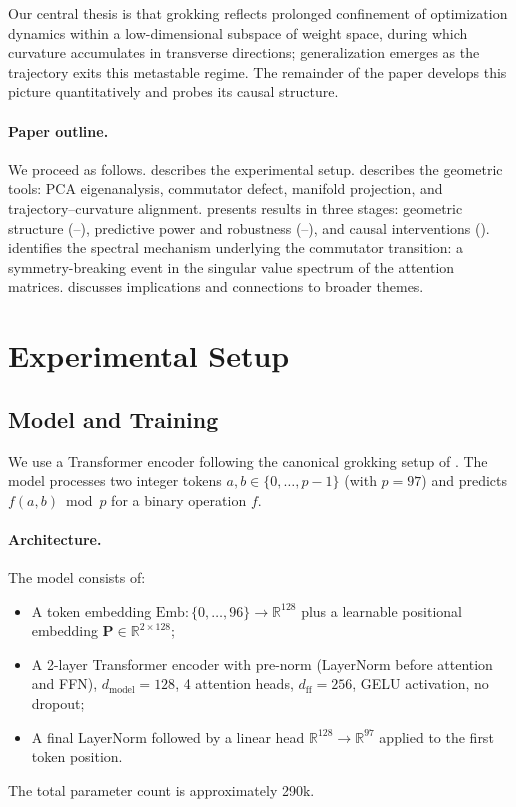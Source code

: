 \documentclass[11pt]{article}
\newcommand{\R}{\mathbb{R}}
\begin{document}
\noindent
Our central thesis is that grokking reflects prolonged confinement of optimization dynamics within a low-dimensional subspace of weight space, during which curvature accumulates in transverse directions; generalization emerges as the trajectory exits this metastable regime.
The remainder of the paper develops this picture quantitatively and probes its causal structure.

\paragraph{Paper outline.}
We proceed as follows.
 describes the experimental setup.
 describes the geometric tools: PCA eigenanalysis, commutator defect, manifold projection, and trajectory--curvature alignment.
 presents results in three stages: geometric structure (--), predictive power and robustness (--), and causal interventions ().
 identifies the spectral mechanism underlying the commutator transition: a symmetry-breaking event in the singular value spectrum of the attention matrices.
 discusses implications and connections to broader themes.


\section{Experimental Setup}
\label{sec:setup}

\subsection{Model and Training}

We use a Transformer encoder following the canonical grokking setup of \citet{power2022grokking}.
The model processes two integer tokens $a, b \in \{0, \ldots, p-1\}$ (with $p = 97$) and predicts $f(a,b) \bmod p$ for a binary operation $f$.

\paragraph{Architecture.}
The model consists of:
\begin{itemize}
    \item A token embedding $\mathrm{Emb}: \{0,\ldots,96\} \to \R^{128}$ plus a learnable positional embedding $\mathbf{P} \in \R^{2 \times 128}$;
    \item A 2-layer Transformer encoder with pre-norm (LayerNorm before attention and FFN), $d_\text{model} = 128$, 4 attention heads, $d_\text{ff} = 256$, GELU activation, no dropout;
    \item A final LayerNorm followed by a linear head $\R^{128} \to \R^{97}$ applied to the first token position.
\end{itemize}
The total parameter count is approximately 290k.
\end{document}
